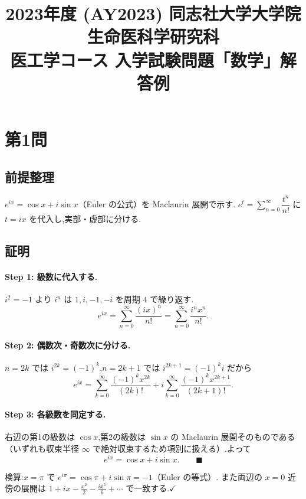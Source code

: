 \documentclass[11pt,a4paper]{article}
\title{2023年度 (AY2023) 同志社大学大学院 生命医科学研究科\\
医工学コース 入学試験問題「数学」解答例}
\author{}
\date{}
\begin{document}
\maketitle
\vspace{-3em}

\section*{第1問}

\subsection*{前提整理}

$e^{ix}=\cos x+i\sin x$（Euler の公式）を Maclaurin 展開で示す.
$e^{t}=\sum_{n=0}^\infty\dfrac{t^n}{n!}$ に $t=ix$ を代入し,実部・虚部に分ける.

\subsection*{証明}

\paragraph{Step 1: 級数に代入する.}
$i^2=-1$ より $i^n$ は $1,i,-1,-i$ を周期 $4$ で繰り返す.
\[
e^{ix}=\sum_{n=0}^{\infty}\frac{(ix)^n}{n!}
=\sum_{n=0}^{\infty}\frac{i^n x^n}{n!}.
\]

\paragraph{Step 2: 偶数次・奇数次に分ける.}
$n=2k$ では $i^{2k}=(-1)^k$,$n=2k+1$ では $i^{2k+1}=(-1)^k i$ だから
\[
e^{ix}=\sum_{k=0}^{\infty}\frac{(-1)^k x^{2k}}{(2k)!}
+i\sum_{k=0}^{\infty}\frac{(-1)^k x^{2k+1}}{(2k+1)!}.
\]

\paragraph{Step 3: 各級数を同定する.}
右辺の第1の級数は $\cos x$,第2の級数は $\sin x$ の Maclaurin 展開そのものである
（いずれも収束半径 $\infty$ で絶対収束するため項別に扱える）.よって
\[
e^{ix}=\cos x+i\sin x.\qquad\blacksquare
\]

検算:$x=\pi$ で $e^{i\pi}=\cos\pi+i\sin\pi=-1$（Euler の等式）.
また両辺の $x=0$ 近傍の展開は $1+ix-\frac{x^2}{2}-\frac{ix^3}{6}+\cdots$ で一致する.$\checkmark$
\end{document}
